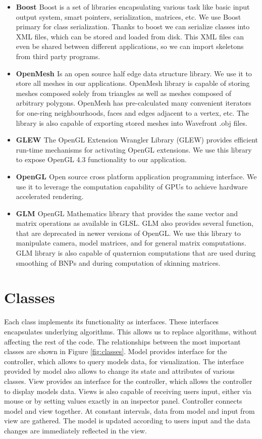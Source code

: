 \begin{itemize}
	\item \textbf{Boost \cite{Boost}} Boost is a set of libraries encapsulating various task like basic input output system, smart pointers, serialization, matrices, etc. We use Boost primary for class serialization. Thanks to boost we can serialize classes into XML files, which can be stored and loaded from disk. This XML files can even be shared between different applications, so we can import skeletons from third party programs.
	\item \textbf{OpenMesh \cite{OpenMesh}} Is an open source half edge data structure library. We use it to store all meshes in our applications. OpenMesh library is capable of storing meshes composed solely from triangles as well as meshes composed of arbitrary polygons. OpenMesh has pre-calculated many convenient iterators for one-ring neighbourhoods, faces and edges adjacent to a vertex, etc. The library is also capable of exporting stored meshes into Wavefront .obj files.
	\item \textbf{GLEW \cite{glew}} The OpenGL Extension Wrangler Library (GLEW) provides efficient run-time mechanisms for activating OpenGL extensions. We use this library to expose OpenGL 4.3 functionality to our application.
	\item \textbf{OpenGL \cite{opengl}} Open source cross platform application programming interface. We use it to leverage the computation capability of GPUs to achieve hardware accelerated rendering.
	\item \textbf{GLM \cite{glm}} OpenGL Mathematics library that provides the same vector and matrix operations as available in GLSL. GLM also provides several function, that are deprecated in newer versions of OpenGL. We use this library to manipulate camera, model matrices, and for general matrix computations. GLM library is also capable of quaternion computations that are used during smoothing of BNPs and during computation of skinning matrices.
\end{itemize}

\pagebreak

\section{Classes}

Each class implements its functionality as interfaces.
These interfaces encapsulates underlying algorithms.
This allows us to replace algorithms, without affecting the rest of the code.
The relationships between the most important classes are shown in Figure \ref{fig:classes}.
Model provides interface for the controller, which allows to query models data, for visualization.
The interface provided by model also allows to change its state and attributes of various classes.
View provides an interface for the controller, which allows the controller to display models data.
Views is also capable of receiving users input, either via mouse or by setting values exactly in an inspector panel.
Controller connects model and view together.
At constant intervals, data from model and input from view are gathered.
The model is updated according to users input and the data changes are immediately reflected in the view.

